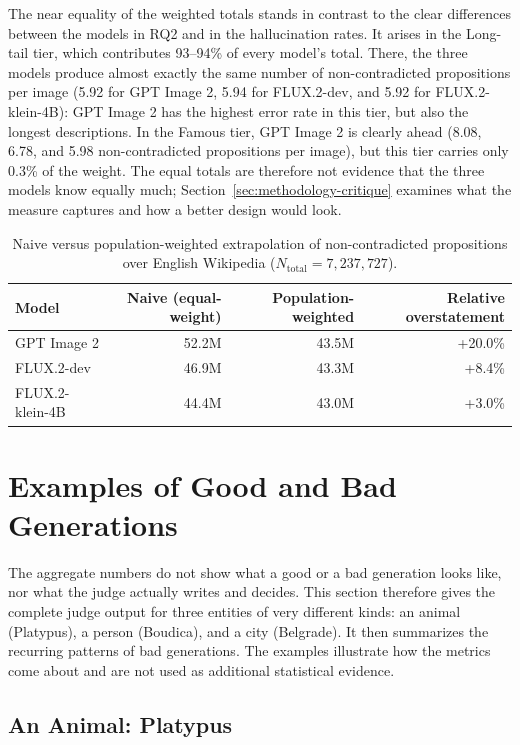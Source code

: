 The near equality of the weighted totals stands in contrast to the clear
differences between the models in RQ2 and in the hallucination rates. It
arises in the Long-tail tier, which contributes 93--94\% of every model's
total. There, the three models produce almost exactly the same number of
non-contradicted propositions per image (5.92 for GPT Image 2, 5.94 for
FLUX.2-dev, and 5.92 for FLUX.2-klein-4B): GPT Image 2 has the highest error
rate in this tier, but also the longest descriptions. In the Famous tier, GPT
Image 2 is clearly ahead (8.08, 6.78, and 5.98 non-contradicted propositions
per image), but this tier carries only 0.3\% of the weight. The equal totals
are therefore not evidence that the three models know equally much;
Section~\ref{sec:methodology-critique} examines what the measure captures and
how a better design would look.

\begin{table}[ht]
\centering
\small
\caption{Naive versus population-weighted extrapolation of non-contradicted propositions over English Wikipedia ($N_{\text{total}} = 7{,}237{,}727$).}
\label{tab:extrapolation}
\begin{tabular}{lrrr}
\toprule
Model & Naive (equal-weight) & Population-weighted & Relative overstatement \\
\midrule
GPT Image 2 & 52.2M & 43.5M & +20.0\% \\
FLUX.2-dev & 46.9M & 43.3M & +8.4\% \\
FLUX.2-klein-4B & 44.4M & 43.0M & +3.0\% \\
\bottomrule
\end{tabular}
\end{table}

\section{Examples of Good and Bad Generations}
\label{sec:qualitative-examples}

The aggregate numbers do not show what a good or a bad generation looks like,
nor what the judge actually writes and decides. This section therefore gives
the complete judge output for three entities of very different kinds: an animal
(Platypus), a person (Boudica), and a city (Belgrade). It then summarizes the
recurring patterns of bad generations. The examples illustrate how the metrics
come about and are not used as additional statistical evidence.

\subsection{An Animal: Platypus}


